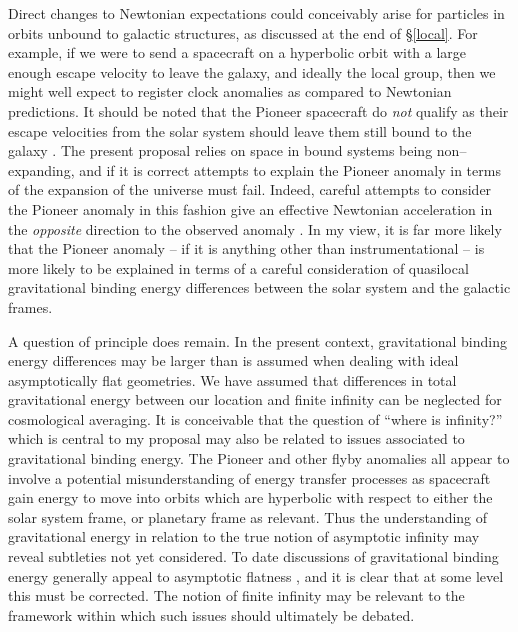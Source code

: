 \documentclass[12pt]{article}
\begin{document}
Direct changes to Newtonian expectations could conceivably arise for particles
in orbits unbound to galactic structures, as discussed at the end of
\S\ref{local}. For example, if we were to send a spacecraft on a hyperbolic
orbit with a large enough escape velocity to leave the galaxy, and ideally
the local group, then we might well expect to register clock anomalies
as compared to Newtonian predictions. It should be noted that the Pioneer
spacecraft do {\it not} qualify as their escape velocities from the solar
system should leave them still bound to the galaxy \cite{Slava}. The
present proposal relies on space in bound systems being non--expanding,
and if it is correct attempts to explain the Pioneer anomaly \cite{Pioneer}
in terms of the expansion of the universe must fail. Indeed, careful attempts
to consider the Pioneer anomaly in this fashion give an effective Newtonian
acceleration in the {\em opposite} direction to the observed anomaly
\cite{CG}. In my view, it is far more likely that the Pioneer anomaly -- if
it is anything other than instrumentational -- is more likely to be explained
in terms of a careful consideration of quasilocal gravitational binding
energy differences between the solar system and the galactic frames.

A question of principle does remain. In the present context, gravitational
binding energy differences may be larger than is assumed when dealing with
ideal asymptotically flat geometries. We
have assumed that differences in total gravitational energy between
our location and finite infinity can be neglected for cosmological averaging.
It is conceivable that the question of ``where is infinity?'' which is
central to my proposal may also be related to issues associated to
gravitational binding energy. The Pioneer and other flyby anomalies all
appear to involve a potential misunderstanding of energy transfer processes
\cite{transfer} as spacecraft gain energy to move into orbits which are
hyperbolic with respect to either the solar system frame, or planetary frame
as relevant. Thus the understanding
of gravitational energy in relation to the true notion of asymptotic
infinity may reveal subtleties not yet considered.
To date discussions of gravitational binding energy generally appeal to
asymptotic flatness \cite{KLB}, and it is clear that at some level this
must be corrected. The notion of finite infinity may be relevant to
the framework within which such issues should ultimately be debated.
\end{document}
